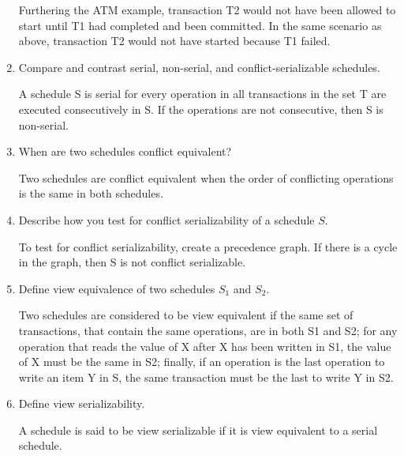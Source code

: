 \documentclass[11pt]{article}
\begin{document}
\begin{enumerate}
		Furthering the ATM example, transaction T2 would not have been allowed to start until T1 had completed and been committed. In the same scenario as above, transaction T2 would not have started because T1 failed.
		
		\item Compare and contrast serial, non-serial, and conflict-serializable schedules.
		
		A schedule S is serial for every operation in all transactions in the set T are executed consecutively in S. If the operations are not consecutive, then S is non-serial.
		
		\item When are two schedules conflict equivalent?
		
		Two schedules are conflict equivalent when the order of conflicting operations is the same in both schedules.
		
		\item Describe how you test for conflict serializability of a schedule $S$.
		
		To test for conflict serializability, create a precedence graph. If there is a cycle in the graph, then S is not conflict serializable.
		
		\item Define view equivalence of two schedules $S_1$ and $S_2$.
		
		Two schedules are considered to be view equivalent if the same set of transactions, that contain the same operations, are in both S1 and S2; for any operation that reads the value of X after X has been written in S1, the value of X must be the same in S2; finally, if an operation is the last operation to write an item Y in S, the same transaction must be the last to write Y in S2.
		
		\item Define view serializability.
		
		A schedule is said to be view serializable if it is view equivalent to a serial schedule.
		
	\end{enumerate}
	
\end{document}
